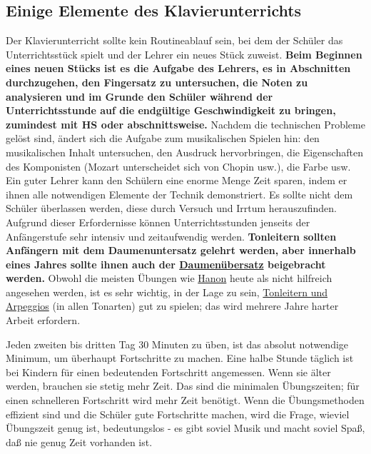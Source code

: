 
\subsection{Einige Elemente des Klavierunterrichts}\hypertarget{c1iii16d}{}

Der Klavierunterricht sollte kein Routineablauf sein, bei dem der Schüler das Unterrichtsstück spielt und der Lehrer ein neues Stück zuweist.
\textbf{Beim Beginnen eines neuen Stücks ist es die Aufgabe des Lehrers, es in Abschnitten durchzugehen, den Fingersatz zu untersuchen, die Noten zu analysieren und im Grunde den Schüler während der Unterrichtsstunde auf die endgültige Geschwindigkeit zu bringen, zumindest mit HS oder abschnittsweise.}
Nachdem die technischen Probleme gelöst sind, ändert sich die Aufgabe zum musikalischen Spielen hin: den musikalischen Inhalt untersuchen, den Ausdruck hervorbringen, die Eigenschaften des Komponisten (Mozart unterscheidet sich von Chopin usw.), die Farbe usw.
Ein guter Lehrer kann den Schülern eine enorme Menge Zeit sparen, indem er ihnen alle notwendigen Elemente der Technik demonstriert.
Es sollte nicht dem Schüler überlassen werden, diese durch Versuch und Irrtum herauszufinden.
Aufgrund dieser Erfordernisse können Unterrichtsstunden jenseits der Anfängerstufe sehr intensiv und zeitaufwendig werden.
\textbf{Tonleitern sollten Anfängern mit dem Daumenuntersatz gelehrt werden, aber innerhalb eines Jahres sollte ihnen auch der \hyperlink{c1iii5b}{Daumenübersatz} beigebracht werden.}
Obwohl die meisten Übungen wie \hyperlink{c1iii7h}{Hanon} heute als nicht hilfreich angesehen werden, ist es sehr wichtig, in der Lage zu sein, \hyperlink{c1iii5}{Tonleitern und Arpeggios} (in allen Tonarten)
gut zu spielen; das wird mehrere Jahre harter Arbeit erfordern.

Jeden zweiten bis dritten Tag 30 Minuten zu üben, ist das absolut notwendige Minimum, um überhaupt Fortschritte zu machen.
Eine halbe Stunde täglich ist bei Kindern für einen bedeutenden Fortschritt angemessen.
Wenn sie älter werden, brauchen sie stetig mehr Zeit.
Das sind die minimalen Übungszeiten; für einen schnelleren Fortschritt wird mehr Zeit benötigt.
Wenn die Übungsmethoden effizient sind und die Schüler gute Fortschritte machen, wird die Frage, wieviel Übungszeit genug ist, bedeutungslos - es gibt soviel Musik und macht soviel Spaß, daß nie genug Zeit vorhanden ist.

